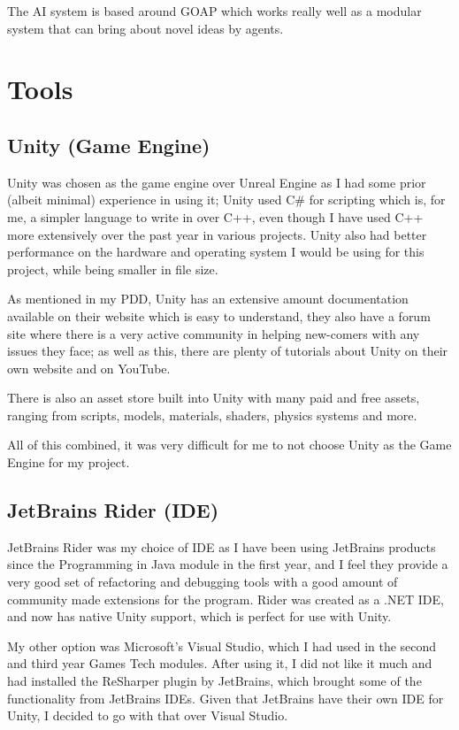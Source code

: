 \documentclass[10pt]{report}
\begin{document}
The AI system is based around GOAP which works really well as a modular system that can bring about novel ideas by agents.

\section{Tools}

\subsection{Unity (Game Engine)}
Unity was chosen as the game engine over Unreal Engine as I had some prior (albeit minimal) experience in using it; Unity used C\# for scripting which is, for me, a simpler language to write in over C++, even though I have used C++ more extensively over the past year in various projects. Unity also had better performance on the hardware and operating system I would be using for this project, while being smaller in file size.

As mentioned in my PDD, Unity has an extensive amount documentation available on their website which is easy to understand, they also have a forum site where there is a very active community in helping new-comers with any issues they face; as well as this, there are plenty of tutorials about Unity on their own website and on YouTube.

There is also an asset store built into Unity with many paid and free assets, ranging from scripts, models, materials, shaders, physics systems and more.

All of this combined, it was very difficult for me to not choose Unity as the Game Engine for my project.

\subsection{JetBrains Rider (IDE)}
JetBrains Rider was my choice of IDE as I have been using JetBrains products since the Programming in Java module in the first year, and I feel they provide a very good set of refactoring and debugging tools with a good amount of community made extensions for the program. Rider was created as a .NET IDE, and now has native Unity support, which is perfect for use with Unity.

My other option was Microsoft's Visual Studio, which I had used in the second and third year Games Tech modules. After using it, I did not like it much and had installed the ReSharper plugin by JetBrains, which brought some of the functionality from JetBrains IDEs. Given that JetBrains have their own IDE for Unity, I decided to go with that over Visual Studio.
\end{document}
